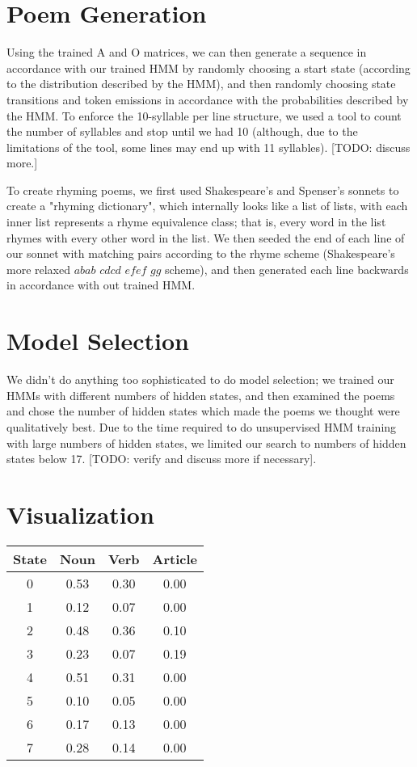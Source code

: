 \section{Poem Generation}
\par Using the trained A and O matrices, we can then generate a sequence in accordance with our trained HMM by randomly choosing a start state (according to the distribution described by the HMM), and then randomly choosing state transitions and token emissions in accordance with the probabilities described by the HMM. To enforce the 10-syllable per line structure, we used a tool to count the number of syllables and stop until we had 10 (although, due to the limitations of the tool, some lines may end up with 11 syllables). [TODO: discuss more.]
\par To create rhyming poems, we first used Shakespeare's and Spenser's sonnets to create a "rhyming dictionary", which internally looks like a list of lists, with each inner list represents a rhyme equivalence class; that is, every word in the list rhymes with every other word in the list. We then seeded the end of each line of our sonnet with matching pairs according to the rhyme scheme (Shakespeare's more relaxed $abab$ $cdcd$ $efef$ $gg$ scheme), and then generated each line backwards in accordance with out trained HMM.

\section{Model Selection}
We didn't do anything too sophisticated to do model selection; we trained our HMMs with different numbers of hidden states, and then examined the poems and chose the number of hidden states which made the poems we thought were qualitatively best. Due to the time required to do unsupervised HMM training with large numbers of hidden states, we limited our search to numbers of hidden states below 17. [TODO: verify and discuss more if necessary].

\section{Visualization}
\begin{tabular}{|c|c|c|c|}
\hline 
State & Noun & Verb & Article \\ 
\hline 
0 & 0.53 & 0.30 & 0.00 \\ 
\hline 
1 & 0.12 & 0.07 & 0.00 \\ 
\hline 
2 & 0.48 & 0.36 & 0.10 \\ 
\hline 
3 & 0.23 & 0.07 & 0.19 \\ 
\hline 
4 & 0.51 & 0.31 & 0.00 \\ 
\hline 
5 & 0.10 & 0.05 & 0.00 \\ 
\hline 
6 & 0.17 & 0.13 & 0.00 \\ 
\hline 
7 & 0.28 & 0.14 & 0.00 \\ 
\hline 
\end{tabular} 

